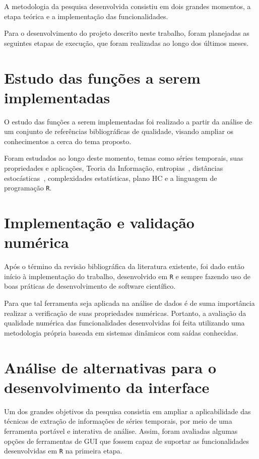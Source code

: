 
A metodologia da pesquisa desenvolvida consistiu em dois grandes momentos, a etapa teórica e a implementação das funcionalidades.

Para o desenvolvimento do projeto descrito neste trabalho, foram planejadas as seguintes etapas de execução, que foram realizadas ao longo dos últimos meses.

\section{Estudo das funções a serem implementadas}

O estudo das funções a serem implementadas foi realizado a partir da análise de um conjunto de referências bibliográficas de qualidade, visando ampliar os conhecimentos a cerca do tema proposto.

Foram estudados ao longo deste momento, temas como séries temporais, suas propriedades e aplicações, Teoria da Informação, entropias~\cite{salicruetal1993}, distâncias estocásticas~\cite{StatisticalInferenceBasedonDivergenceMeasures}, complexidades estatísticas, plano HC e a linguagem de programação \texttt R.

\section{Implementação e validação numérica}

Após o término da revisão bibliográfica da literatura existente, foi dado então início à implementação do trabalho, desenvolvido em \texttt R e sempre fazendo uso de boas práticas de desenvolvimento de software científico.

Para que tal ferramenta seja aplicada na análise de dados é de suma importância realizar a verificação de suas propriedades numéricas. 
Portanto, a avaliação da qualidade numérica das funcionalidades desenvolvidas foi feita utilizando uma metodologia própria baseada em sistemas dinâmicos com saídas conhecidas.

\section{Análise de alternativas para o desenvolvimento da interface}

Um dos grandes objetivos da pesquisa consistia em ampliar a aplicabilidade das técnicas de extração de informações de séries temporais, por meio de uma ferramenta portável e interativa de análise. Assim, foram avaliadas algumas opções de ferramentas de GUI que fossem capaz de suportar as funcionalidades desenvolvidas em \texttt R na primeira etapa.

